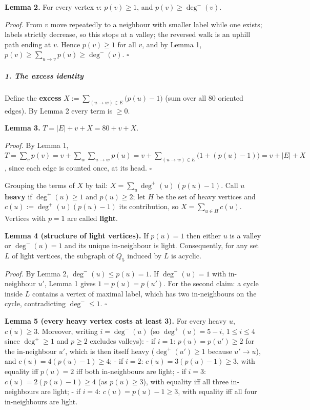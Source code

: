 \textbf{Lemma 2.} For every vertex \(v\): \(p(v)\ge1\), and
\(p(v)\ge\deg^-(v)\).

\emph{Proof.} From \(v\) move repeatedly to a neighbour with smaller
label while one exists; labels strictly decrease, so this stops at a
valley; the reversed walk is an uphill path ending at \(v\). Hence
\(p(v)\ge1\) for all \(v\), and by Lemma 1,
\(p(v)\ge\sum_{u\to v}p(u)\ge\deg^-(v)\). \(\square\)

\subparagraph{1. The excess identity}\label{the-excess-identity}

Define the \textbf{excess} \(X:=\sum_{(u\to w)\in E}\bigl(p(u)-1\bigr)\)
(sum over all \(80\) oriented edges). By Lemma 2 every term is \(\ge0\).

\textbf{Lemma 3.} \(T=|E|+v+X = 80+v+X\).

\emph{Proof.} By Lemma 1,
\(T=\sum_v p(v)=v+\sum_{w}\sum_{u\to w}p(u)=v+\sum_{(u\to w)\in E}\bigl(1+(p(u)-1)\bigr)=v+|E|+X\),
since each edge is counted once, at its head. \(\square\)

Grouping the terms of \(X\) by tail: \(X=\sum_u \deg^+(u)\,(p(u)-1)\).
Call \(u\) \textbf{heavy} if \(\deg^+(u)\ge1\) and \(p(u)\ge2\); let
\(H\) be the set of heavy vertices and \(c(u):=\deg^+(u)(p(u)-1)\) its
contribution, so \(X=\sum_{u\in H}c(u)\). Vertices with \(p=1\) are
called \textbf{light}.

\textbf{Lemma 4 (structure of light vertices).} If \(p(u)=1\) then
either \(u\) is a valley or \(\deg^-(u)=1\) and its unique in-neighbour
is light. Consequently, for any set \(L\) of light vertices, the
subgraph of \(Q_5\) induced by \(L\) is acyclic.

\emph{Proof.} By Lemma 2, \(\deg^-(u)\le p(u)=1\). If \(\deg^-(u)=1\)
with in-neighbour \(u'\), Lemma 1 gives \(1=p(u)=p(u')\). For the second
claim: a cycle inside \(L\) contains a vertex of maximal label, which
has two in-neighbours on the cycle, contradicting \(\deg^-\le1\).
\(\square\)

\textbf{Lemma 5 (every heavy vertex costs at least 3).} For every heavy
\(u\), \(c(u)\ge3\). Moreover, writing \(i=\deg^-(u)\) (so
\(\deg^+(u)=5-i\), \(1\le i\le4\) since \(\deg^+\ge1\) and \(p\ge2\)
excludes valleys): - if \(i=1\): \(p(u)=p(u')\ge2\) for the in-neighbour
\(u'\), which is then itself heavy (\(\deg^+(u')\ge1\) because
\(u'\to u\)), and \(c(u)=4(p(u)-1)\ge4\); - if \(i=2\):
\(c(u)=3(p(u)-1)\ge3\), with equality iff \(p(u)=2\) iff both
in-neighbours are light; - if \(i=3\): \(c(u)=2(p(u)-1)\ge4\) (as
\(p(u)\ge3\)), with equality iff all three in-neighbours are light; - if
\(i=4\): \(c(u)=p(u)-1\ge3\), with equality iff all four in-neighbours
are light.


